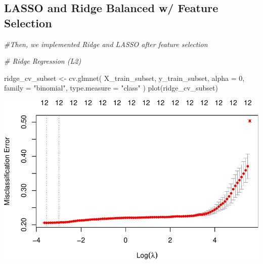 \documentclass[
]{article}
\newenvironment{Shaded}{\begin{snugshade}}{\end{snugshade}}
\newcommand{\AttributeTok}[1]{\textcolor[rgb]{0.77,0.63,0.00}{#1}}
\newcommand{\CommentTok}[1]{\textcolor[rgb]{0.56,0.35,0.01}{\textit{#1}}}
\newcommand{\DecValTok}[1]{\textcolor[rgb]{0.00,0.00,0.81}{#1}}
\newcommand{\FunctionTok}[1]{\textcolor[rgb]{0.00,0.00,0.00}{#1}}
\newcommand{\NormalTok}[1]{#1}
\newcommand{\OtherTok}[1]{\textcolor[rgb]{0.56,0.35,0.01}{#1}}
\newcommand{\SpecialCharTok}[1]{\textcolor[rgb]{0.00,0.00,0.00}{#1}}
\newcommand{\StringTok}[1]{\textcolor[rgb]{0.31,0.60,0.02}{#1}}
\begin{document}
\hypertarget{lasso-and-ridge-balanced-w-feature-selection}{%
\subsection{LASSO and Ridge Balanced w/ Feature
Selection}\label{lasso-and-ridge-balanced-w-feature-selection}}

\begin{Shaded}
\begin{Highlighting}[]
\CommentTok{\#Then, we implemented Ridge and LASSO after feature selection}

\CommentTok{\# Ridge Regression (L2)}

\NormalTok{ridge\_cv\_subset }\OtherTok{\textless{}{-}}
  \FunctionTok{cv.glmnet}\NormalTok{(}
\NormalTok{    X\_train\_subset,}
\NormalTok{    y\_train\_subset,}
    \AttributeTok{alpha =} \DecValTok{0}\NormalTok{,}
    \AttributeTok{family =} \StringTok{"binomial"}\NormalTok{,}
    \AttributeTok{type.measure =} \StringTok{"class"}
\NormalTok{  )}
\FunctionTok{plot}\NormalTok{(ridge\_cv\_subset)}
\end{Highlighting}
\end{Shaded}

\includegraphics{Rain_Australia_files/figure-latex/unnamed-chunk-2-1.pdf}

\begin{Shaded}
\end{Shaded}
\end{document}
